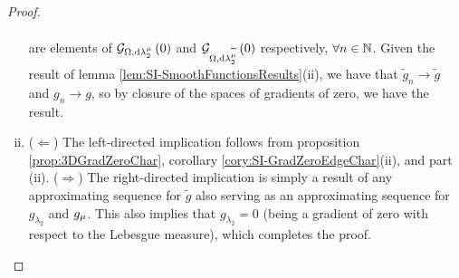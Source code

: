 \begin{proof}
\begin{enumerate}[(i)]
\begin{align*}
		\end{align*}
		are elements of $\mathcal{G}_{ \Omega, \mathrm{d}\lambda_2^{\mu}}\left( 0 \right)$ and $\mathcal{G}_{ \Omega, \mathrm{d}\lambda_2^{\widetilde{\mu}}}\left( 0 \right)$ respectively, $\forall n\in\mathbb{N}$.
		Given the result of lemma \ref{lem:SI-SmoothFunctionsResults}(ii), we have that $\widetilde{g}_n\rightarrow\widetilde{g}$ and $g_n\rightarrow g$, so by closure of the spaces of gradients of zero, we have the result.
		\item ($\Leftarrow$) The left-directed implication follows from proposition \ref{prop:3DGradZeroChar}, corollary \ref{cory:SI-GradZeroEdgeChar}(ii), and part (ii). \newline
	($\Rightarrow$) The right-directed implication is simply a result of any approximating sequence for $\tilde{g}$ also serving as an approximating sequence for $g_{\lambda_2}$ and $g_{\mu}$.
	This also implies that $g_{\lambda_2} = 0$ (being a gradient of zero with respect to the Lebesgue measure), which completes the proof.
	\end{enumerate}
\end{proof}

